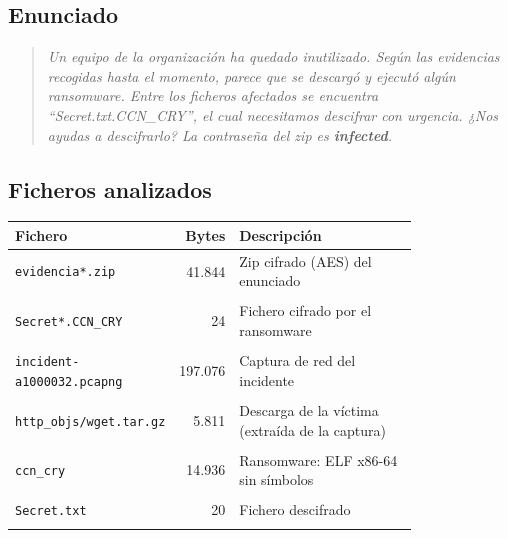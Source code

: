 \documentclass[11pt,a4paper]{article}
\begin{document}
\subsection{Enunciado}
\begin{quote}\itshape
Un equipo de la organización ha quedado inutilizado. Según las evidencias recogidas hasta el momento, parece que se
descargó y ejecutó algún ransomware. Entre los ficheros afectados se encuentra ``Secret.txt.CCN\_CRY'', el cual
necesitamos descifrar con urgencia. ¿Nos ayudas a descifrarlo? La contraseña del zip es \textbf{infected}.
\end{quote}

\subsection{Ficheros analizados}
\begin{longtable}{@{}L{0.30\linewidth}r L{0.50\linewidth}@{}}
\toprule \textbf{Fichero} & \textbf{Bytes} & \textbf{Descripción} \\ \midrule \endhead
\texttt{evidencia*.zip} & 41.844 & Zip cifrado (AES) del enunciado \\ \nopagebreak
{} \\ \midrule
\texttt{Secret*.CCN\_\allowbreak{}CRY} & 24 & Fichero cifrado por el ransomware \\ \nopagebreak
{} \\ \midrule
\texttt{incident-a1000032.pcapng} & 197.076 & Captura de red del incidente \\ \nopagebreak
{} \\ \midrule
\texttt{http\_\allowbreak{}objs/\allowbreak{}wget.tar.gz} & 5.811 & Descarga de la víctima (extraída de la captura) \\ \nopagebreak
{} \\ \midrule
\texttt{ccn\_\allowbreak{}cry} & 14.936 & Ransomware: ELF x86-64 sin símbolos \\ \nopagebreak
{} \\ \midrule
\texttt{Secret.txt} & 20 & Fichero descifrado \\ \nopagebreak
{} \\ \midrule
\end{longtable}
\end{document}
